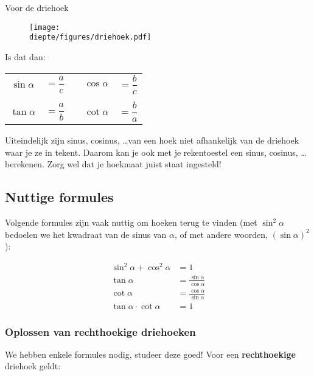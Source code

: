 \documentclass[a4paper,12pt]{article}
\newcommand{\diepte}{./}
\begin{document}
Voor de driehoek

\begin{figure}[h]
\begin{center}
\texttt{[image: \\diepte/figures/driehoek.pdf]}
\end{center}
\end{figure}

Is dat dan:

\begin{framed}
\begin{center}
\begin{tabular}{ccccc}
$\sin \alpha$ &$= \dfrac{a}{c}$ &\qquad\qquad\qquad& $\cos \alpha$ &$= \dfrac{b}{c}$\\
&&&&\\
$\tan \alpha$ &$= \dfrac{a}{b}$ &\qquad\qquad\qquad& $\cot \alpha$ &$= \dfrac{b}{a}$
\end{tabular}
\end{center}
\end{framed}

Uiteindelijk zijn sinus, cosinus, \ldots van een hoek niet afhankelijk van de driehoek waar je ze in tekent. Daarom kan je ook met je rekentoestel een sinus, cosinus, \ldots berekenen. Zorg wel dat je hoekmaat juist staat ingesteld!

\subsection{Nuttige formules}

Volgende formules zijn vaak nuttig om hoeken terug te vinden (met $\sin^2 \alpha$ bedoelen we het kwadraat van de sinus van $\alpha$, of met andere woorden, $(\sin \alpha)^2$):

\begin{framed}
\begin{align*}
\sin^2 \alpha + \cos^2 \alpha &= 1\\
\tan \alpha &= \frac{\sin \alpha}{\cos \alpha}\\
\cot \alpha &= \frac{\cos \alpha}{\sin \alpha}\\
\tan \alpha\cdot \cot \alpha &= 1
\end{align*}
\end{framed}

\subsubsection{Oplossen van rechthoekige driehoeken}
We hebben enkele formules nodig, studeer deze goed!  Voor een {\bf rechthoekige} driehoek geldt:
\end{document}
